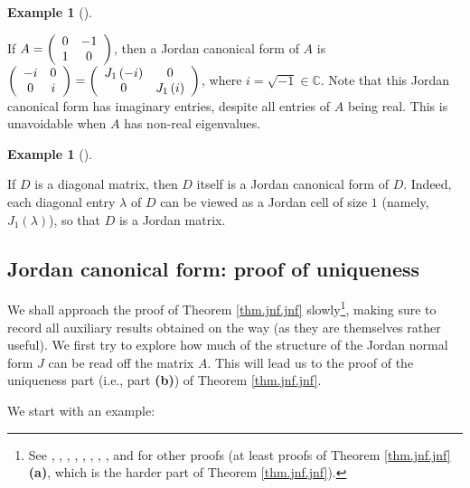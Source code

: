 \documentclass[numbers=enddot,12pt,final,onecolumn,notitlepage]{scrartcl}%
\numberwithin{exer}{subsection}
\theoremstyle{definition}
\newtheorem{exam}[theo]{Example}
\newenvironment{example}[1][]
{\begin{exam}[#1]\begin{leftbar}}
{\end{leftbar}\end{exam}}
\begin{document}
\begin{example}
If $A=\left(
\begin{array}
[c]{cc}%
0 & -1\\
1 & 0
\end{array}
\right)  $, then a Jordan canonical form of $A$ is $\left(
\begin{array}
[c]{cc}%
-i & 0\\
0 & i
\end{array}
\right)  =\left(
\begin{array}
[c]{cc}%
J_{1}\left(  -i\right)  & 0\\
0 & J_{1}\left(  i\right)
\end{array}
\right)  $, where $i=\sqrt{-1}\in\mathbb{C}$. Note that this Jordan canonical
form has imaginary entries, despite all entries of $A$ being real. This is
unavoidable when $A$ has non-real eigenvalues.
\end{example}

\begin{example}
If $D$ is a diagonal matrix, then $D$ itself is a Jordan canonical form of
$D$. Indeed, each diagonal entry $\lambda$ of $D$ can be viewed as a Jordan
cell of size $1$ (namely, $J_{1}\left(  \lambda\right)  $), so that $D$ is a
Jordan matrix.
\end{example}

\subsection{Jordan canonical form: proof of uniqueness}

We shall approach the proof of Theorem \ref{thm.jnf.jnf} slowly\footnote{See
\cite[Chapter VII, \S 5, section 4]{Bourba03}, \cite[Theorem 31.17]{GalQua20},
\cite[Chapter Five, Section IV, Theorem 2.8]{Heffer20},
\cite[\S 8.10--\S 8.11]{Loehr14}, \cite[\S 4.6]{OmClVi11}, \cite[\S 12.2]%
{Prasolov}, \cite[\S 4.3]{Shapir15}, \cite[\S 2.4]{Taylor20}, \cite[Chapter 9,
Theorem 5.1]{Treil15} and \cite[Theorem 4.4.1]{Woerde16} for other proofs (at
least proofs of Theorem \ref{thm.jnf.jnf} \textbf{(a)}, which is the harder
part of Theorem \ref{thm.jnf.jnf}).}, making sure to record all auxiliary
results obtained on the way (as they are themselves rather useful). We first
try to explore how much of the structure of the Jordan normal form $J$ can be
read off the matrix $A$. This will lead us to the proof of the uniqueness part
(i.e., part \textbf{(b)}) of Theorem \ref{thm.jnf.jnf}.

We start with an example:
\end{document}
